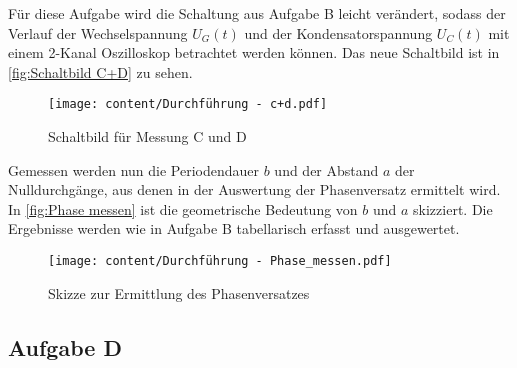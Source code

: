Für diese Aufgabe wird die Schaltung aus Aufgabe B leicht verändert, sodass der Verlauf der Wechselspannung  $U_{G}(t)$
und der Kondensatorspannung $U_{C}(t)$ mit einem 2-Kanal Oszilloskop betrachtet werden können.
Das neue Schaltbild ist in \autoref{fig:Schaltbild C+D} zu sehen.

\begin{figure}
    \centering
    \texttt{[image: content/Durchführung - c+d.pdf]}
    \caption{Schaltbild für Messung C und D \cite{v353}}
    \label{fig:Schaltbild C+D}
\end{figure}

Gemessen werden nun die Periodendauer $b$ und der Abstand $a$ der Nulldurchgänge, aus denen in der Auswertung
der Phasenversatz ermittelt wird. In \autoref{fig:Phase messen} ist die geometrische Bedeutung von $b$ und $a$ skizziert.
Die Ergebnisse werden wie in Aufgabe B tabellarisch erfasst und ausgewertet.

\begin{figure}
    \centering
    \texttt{[image: content/Durchführung - Phase\_messen.pdf]}
    \caption{Skizze zur Ermittlung des Phasenversatzes \cite{v353}}
    \label{fig:Phase messen}
\end{figure}

\subsection{Aufgabe D}